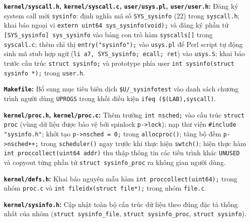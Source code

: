 \item \textbf{\texttt{kernel/syscall.h}, \texttt{kernel/syscall.c}, \texttt{user/usys.pl}, \texttt{user/user.h}:} Đăng ký system call mới \texttt{sysinfo}: định nghĩa mã số \texttt{SYS\_sysinfo} (22) trong \texttt{syscall.h}; khai báo ngoại vi \texttt{extern uint64 sys\_sysinfo(void);} và đăng ký phần tử \texttt{[SYS\_sysinfo] sys\_sysinfo} vào bảng con trỏ hàm \texttt{syscalls[]} trong \texttt{syscall.c}; thêm chỉ thị \texttt{entry("sysinfo");} vào \texttt{usys.pl} để Perl script tự động sinh mã stub hợp ngữ (\texttt{li a7, SYS\_sysinfo; ecall; ret}) vào \texttt{usys.S}; khai báo trước cấu trúc \texttt{struct sysinfo;} và prototype phía user \texttt{int sysinfo(struct sysinfo *);} trong \texttt{user.h}.

\item \textbf{\texttt{Makefile}:} Bổ sung mục tiêu biên dịch \texttt{\$U/\_sysinfotest} vào danh sách chương trình người dùng \texttt{UPROGS} trong khối điều kiện \texttt{ifeq (\$(LAB),syscall)}.

\item \textbf{\texttt{kernel/proc.h}, \texttt{kernel/proc.c}:} Thêm trường \texttt{int nsched;} vào cấu trúc \texttt{struct proc} (vùng dữ liệu được bảo vệ bởi spinlock \texttt{p->lock}); nạp thư viện \texttt{\#include "sysinfo.h"}; khởi tạo \texttt{p->nsched = 0;} trong \texttt{allocproc()}; tăng bộ đếm \texttt{p->nsched++;} trong \texttt{scheduler()} ngay trước khi thực hiện \texttt{swtch()}; hiện thực hàm \texttt{int proccollect(uint64 addr)} thu thập thông tin các tiến trình khác \texttt{UNUSED} và copyout từng phần tử \texttt{struct sysinfo\_proc} ra không gian người dùng.

\item \textbf{\texttt{kernel/defs.h}:} Khai báo nguyên mẫu hàm \texttt{int proccollect(uint64);} trong nhóm \texttt{proc.c} và \texttt{int fileidx(struct file*);} trong nhóm \texttt{file.c}.

\item \textbf{\texttt{kernel/sysinfo.h}:} Cập nhật toàn bộ cấu trúc dữ liệu theo đúng đặc tả thống nhất của nhóm (\texttt{struct sysinfo\_file}, \texttt{struct sysinfo\_proc}, \texttt{struct sysinfo}).
